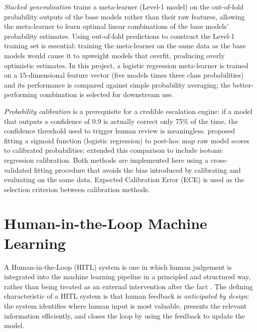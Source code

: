 \documentclass[12pt, a4paper]{report}
\begin{document}
  \emph{Stacked generalisation} \citep{wolpert1992stacked} trains a meta-learner
  (Level-1 model) on the out-of-fold probability outputs of the base models rather
  than their raw features, allowing the meta-learner to learn optimal linear
  combinations of the base models' probability estimates. Using out-of-fold predictions
  to construct the Level-1 training set is essential: training the meta-learner on the
  same data as the base models would cause it to upweight models that overfit,
  producing overly optimistic estimates. In this project, a logistic regression
  meta-learner is trained on a 15-dimensional feature vector (five models times three
  class probabilities) and its performance is compared against simple probability
  averaging; the better-performing combination is selected for downstream use.

  \emph{Probability calibration} is a prerequisite for a credible escalation engine:
  if a model that outputs a confidence of 0.9 is actually correct only 75\% of the
  time, the confidence threshold used to trigger human review is meaningless.
  \citet{platt1999probabilistic} proposed fitting a sigmoid function (logistic
  regression) to post-hoc map raw model scores to calibrated probabilities;
  \citet{niculescu2005predicting} extended this comparison to include isotonic
  regression calibration. Both methods are implemented here using a cross-validated
  fitting procedure that avoids the bias introduced by calibrating and evaluating on
  the same data. Expected Calibration Error (ECE) is used as the selection criterion
  between calibration methods.

  \section{Human-in-the-Loop Machine Learning}
  \label{sec:hitl}

  A Human-in-the-Loop (HITL) system is one in which human judgement is integrated
  into the machine learning pipeline in a principled and structured way, rather than
  being treated as an external intervention after the fact
  \citep{monarch2021hitl, amershi2014power}. The defining characteristic of a HITL
  system is that human feedback is \emph{anticipated by design}: the system identifies
  where human input is most valuable, presents the relevant information efficiently,
  and closes the loop by using the feedback to update the model.
\end{document}
